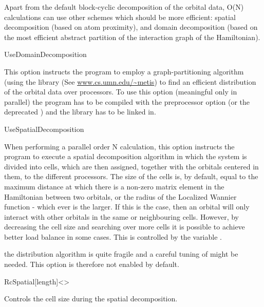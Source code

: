   Apart from the default block-cyclic decomposition of the orbital data,
  O(N) calculations can use other schemes which should be more
  efficient: spatial decomposition (based on atom proximity), and domain
  decomposition (based on the most efficient abstract partition of the
  interaction graph of the Hamiltonian).
  
  
  \begin{fdflogicalF}{UseDomainDecomposition}
  
    This option instructs the program to employ a graph-partitioning
    algorithm (using the  library (See
    \url{www.cs.umn.edu/~metis}) to find an efficient distribution of
    the orbital data over processors.  To use this option (meaningful
    only in parallel) the program has to be compiled with the
    preprocessor option  (or the deprecated
    ) and the  library has to
    be linked in.
  
  \end{fdflogicalF}
  
  \begin{fdflogicalF}{UseSpatialDecomposition}
  
    When performing a parallel order N calculation, this option
    instructs the program to execute a spatial decomposition algorithm
    in which the system is divided into cells, which are then assigned,
    together with the orbitals centered in them, to the different
    processors. The size of the cells is, by default, equal to the
    maximum distance at which there is a non-zero matrix element in the
    Hamiltonian between two orbitals, or the radius of the Localized
    Wannier function - which ever is the larger. If this is the case,
    then an orbital will only interact with other orbitals in the same
    or neighbouring cells. However, by decreasing the cell size and
    searching over more cells it is possible to achieve better load
    balance in some cases. This is controlled by the variable
    .
  
    \note the distribution algorithm is quite fragile and a careful
    tuning of  might be needed. This option is therefore
    not enabled by default.
  
  \end{fdflogicalF}
  
  \begin{fdfentry}{RcSpatial}[length]<>
  
    Controls the cell size during the spatial decomposition.
  
  \end{fdfentry}
